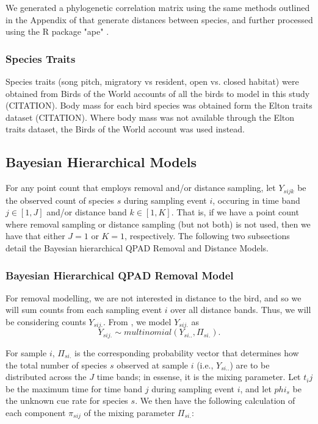 \documentclass[12pt]{article}
\begin{document}
\par We generated a phylogenetic correlation matrix using the same methods outlined in the Appendix of \citet{solymos_phylogeny_2018} that generate distances between species, and further processed using the R package "ape" \citet{paradis_ape_2019}.

\subsubsection{Species Traits}
\par Species traits (song pitch, migratory vs resident, open vs. closed habitat) were obtained from Birds of the World accounts of all the birds to model in this study (CITATION). 
Body mass for each bird species was obtained form the Elton traits dataset (CITATION). 
Where body mass was not available through the Elton traits dataset, the Birds of the World account was used instead.

\subsection{Bayesian Hierarchical Models}

\par For any point count that employs removal and/or distance sampling, let $Y_{sijk}$ be the observed count of species $s$ during sampling event $i$, occuring in time band $j \in [1,J]$ and/or distance band $k \in [1,K]$.
That is, if we have a point count where removal sampling or distance sampling (but not both) is not used, then we have that either $J = 1$ or $K = 1$, respectively. 
The following two subsections detail the Bayesian hierarchical QPAD Removal and Distance Models.

\subsubsection{Bayesian Hierarchical QPAD Removal Model}

\par For removal modelling, we are not interested in distance to the bird, and so we will sum counts from each sampling event $i$ over all distance bands. 
Thus, we will be considering counts $Y_{sij.}$. 
From \citet{solymos_calibrating_2013}, we model $Y_{sij.}$ as
$$Y_{sij.} \sim multinomial\left(Y_{si..}, \Pi_{si.}\right).$$

\par For sample $i$, $\Pi_{si.}$ is the corresponding probability vector that determines how the total number of species $s$ observed at sample $i$ (i.e., $Y_{si..}$) are to be distributed across the $J$ time bands; in essense, it is the mixing parameter.
Let $t_ij$ be the maximum time for time band $j$ during sampling event $i$, and let $phi_s$ be the unknown cue rate for species $s$.
We then have the following calculation of each component $\pi_{sij}$ of the mixing parameter $\Pi_{si.}$:
\end{document}
